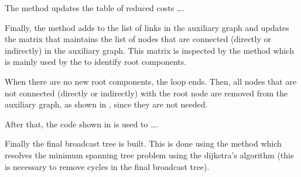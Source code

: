 The  method updates the table of reduced costs \ldots.

Finally, the  method adds  to the list of links in
the auxiliary graph and updates the  matrix that maintains the
list of nodes that are connected (directly or indirectly) in the auxiliary
graph. This matrix is inspected by the  method which is
mainly used by the  to identify root components.

When there are no new root components, the loop ends. Then, all nodes that are
not connected (directly or indirectly) with the root node are removed from the
auxiliary graph, as shown in , since they are
not needed.



After that, the code shown in  is used to
\ldots.



Finally the final broadcast tree is built. This is done using the
 method which resolves the minimum spanning tree
problem using the dijkstra's algorithm (this is necessary to remove cycles in
the final broadcast tree).

